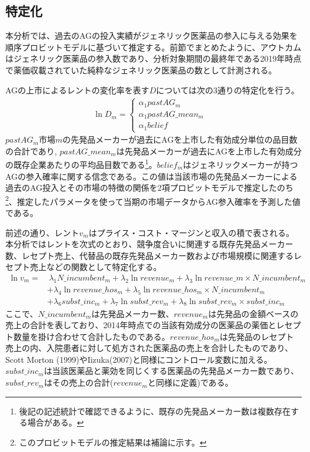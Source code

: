 \documentclass[a4j,10.5pt]{jarticle}
\begin{document}
\subsection{特定化}
本分析では、過去のAGの投入実績がジェネリック医薬品の参入に与える効果を順序プロビットモデルに基づいて推定する。前節でまとめたように、アウトカムはジェネリック医薬品の参入数であり、分析対象期間の最終年である2019年時点で薬価収載されていた純粋なジェネリック医薬品の数として計測される。\par
AGの上市によるレントの変化率を表す$D$については次の3通りの特定化を行う。
\begin{align}
    \ln D_m = 
    \left\{
        \begin{array}{lc}
            \alpha_1 pastAG_m  &  \\
            \alpha_1 pastAG\_mean_m &  \\
            \alpha_1 belief
        \end{array}
    \right.    
\end{align}
$pastAG_m$市場$m$の先発品メーカーが過去にAGを上市した有効成分単位の品目数の合計であり, $pastAG\_mean_m$は先発品メーカーが過去にAGを上市した有効成分の既存企業あたりの平均品目数である\footnote{後記の記述統計で確認できるように、既存の先発品メーカー数は複数存在する場合がある。}。$belief_m$はジェネリックメーカーが持つAGの参入確率に関する信念である。この値は当該市場の先発品メーカーによる過去のAG投入とその市場の特徴の関係を2項プロビットモデルで推定したのち\footnote{このプロビットモデルの推定結果は補論に示す。}、推定したパラメータを使って当期の市場データからAG参入確率を予測した値である。\par
前述の通り、レント$v_m$はプライス・コスト・マージンと収入の積で表される。本分析ではレントを次式のとおり、競争度合いに関連する既存先発品メーカー数、レセプト売上、代替品の既存先発品メーカー数および市場規模に関連するレセプト売上などの関数として特定化する。
\begin{align}
    \ln v_m = 
    & \  \lambda_1 N\_incumbent_m + \lambda_2 \ln revenue_m+ \lambda_3 \ln revenue\_m \times N\_incumbent_m \nonumber \\
&+\lambda_4 \ln revenue\_hos_m+ \lambda_5 \ln revenue\_hos_m \times N\_incumbent_m \\ &+\lambda_6subst\_inc_m + \lambda_7 \ln subst\_rev_m+ \lambda_8 \ln subst\_rev_m \times subst\_inc_m \nonumber
\end{align}
ここで、$N\_incumbent_m$は先発品メーカー数、$revenue_m$は先発品の金額ベースの売上の合計を表しており、2014年時点での当該有効成分の医薬品の薬価とレセプト数量を掛け合わせて合計したものである。$revenue\_hos_m$は先発品のレセプト売上の内、入院患者に対して処方された医薬品の売上を合計したものであり、Scott Morton (1999)やIizuka(2007)と同様にコントロール変数に加える。$subst\_inc_m$は当該医薬品と薬効を同じくする医薬品の先発品メーカー数であり、$subst\_rev_m$はその売上の合計($revenue_m$と同様に定義)である。\par
\end{document}
